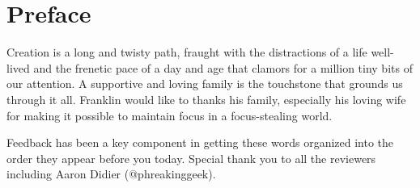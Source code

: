 \chapter*{Preface}
\vspace{5mm}

\justify
Creation is a long and twisty path, fraught with the distractions of a life well-lived and the frenetic pace of a day and age that clamors for a million tiny bits of our attention. A supportive and loving family is the touchstone that grounds us through it all. Franklin would like to thanks his family, especially his loving wife for making it possible to maintain focus in a focus-stealing world.

\justify
Feedback has been a key component in getting these words organized into the order they appear before you today. Special thank you to all the reviewers including Aaron Didier (@phreakinggeek).
